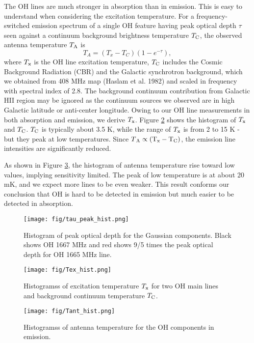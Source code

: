 \documentclass[preprint]{emulateapj}
\begin{document}
The OH lines are much stronger in absorption than in emission. This is easy to understand when considering the excitation temperature. For a frequency-switched emission spectrum of a single OH feature having peak optical depth $\tau$ seen against a continuum background brightness temperature $T\rm_C$, the observed antenna temperature $T\rm_A$ is 
 \begin{equation}
T_A=(T_{x}-T_{C})(1-e^{-\tau}),
\label{eq4} 
\end{equation}
where  $T\rm_x$ is the OH line excitation temperature, $T\rm_C$ includes the Cosmic Background Radiation (CBR) and  the Galactic synchrotron background, which we obtained from  408 MHz map (Haslam et al. 1982) and scaled in frequency with spectral index of 2.8. The  background continuum contribution from Galactic HII region may be ignored as the continuum sources we observed are in high Galactic latitude or anti-center longitude.  Owing to our OH line measurements in both absorption and emission, we derive $T\rm_x$. Figure \ref{fig:Tex_hist} shows the histogram of $T\rm_x$ and $T\rm_C$. $T\rm_C$ is typically about 3.5 K, while the range of $T\rm_x$ is from 2 to 15 K - but they peak at low temperatures. Since $T\rm{_A} \propto (T\rm{_x}-T\rm{_C})$, the emission line intensities are significantly reduced. 

As shown in Figure \ref{fig:Tant_hist}, the histogram of antenna temperature rise toward low values, implying sensitivity limited. The peak of low temperature is at about 20 mK, and we expect more lines to be even weaker. This result conforms our conclusion that OH is hard to be detected in emission but much easier to be detected in absorption. 

\begin{figure}
\texttt{[image: fig/tau\_peak\_hist.png]}
\caption{Histogram of peak optical depth for the Gaussian components. Black shows OH 1667 MHz and red shows 9/5 times the peak optical depth for OH 1665 MHz line. }
\label{fig:taupeak_hist} 
\end{figure}

\begin{figure}
\texttt{[image: fig/Tex\_hist.png]}
\caption{Histogramss of excitation temperature $T\rm_{x}$ for two OH main lines and background continuum temperature $T\rm_C$.}
\label{fig:Tex_hist} 
\end{figure}

\begin{figure}
\texttt{[image: fig/Tant\_hist.png]}
\caption{Histogramss of  antenna temperature for the OH components in emission.}
\label{fig:Tant_hist} 
\end{figure}
\end{document}
